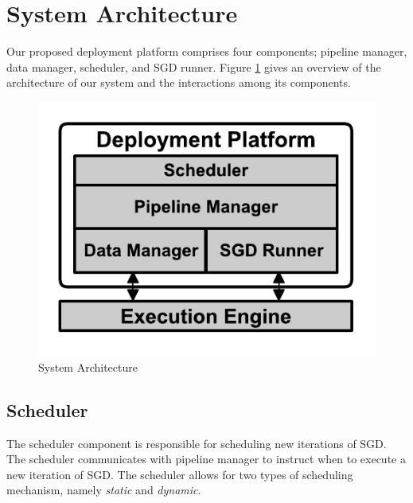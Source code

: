 \section{System Architecture} \label{sec:system-architecutre}
Our proposed deployment platform comprises four components; pipeline manager, data manager, scheduler, and SGD runner.
Figure \ref{fig:system-architecture} gives an overview of the architecture of our system and the interactions among its components.

\begin{figure}[t]
\centering
\includegraphics[width=\columnwidth]{../images/system-architecture.pdf}
\caption{System Architecture}
\label{fig:system-architecture}
\end{figure}

\subsection{Scheduler}\label{scheduler}
The scheduler component is responsible for scheduling new iterations of SGD.
The scheduler communicates with pipeline manager to instruct when to execute a new iteration of SGD.
The scheduler allows for two types of scheduling mechanism, namely \textit{static} and \textit{dynamic}.

